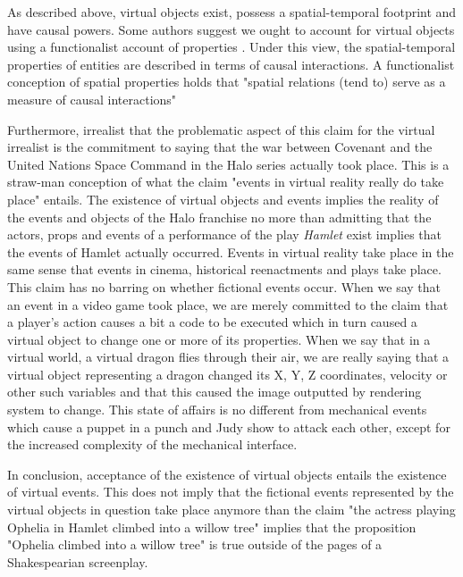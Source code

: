  As described above, virtual objects exist, possess a spatial-temporal footprint and have causal powers. Some authors suggest we ought to account for virtual objects using a functionalist account of properties \cite{ChalmersVR}. Under this view, the spatial-temporal properties of entities are described in terms of causal interactions. A functionalist conception of spatial properties holds that "spatial relations (tend to) serve as a measure of causal
interactions" \cite{ChalmersVR} 


   Furthermore, irrealist that the problematic aspect of this claim for the virtual irrealist is the commitment to saying that the war between Covenant and the United Nations Space Command in the Halo series actually took place. This is a straw-man conception of what the claim "events in virtual reality really do take place" entails. The existence of virtual objects and events implies the reality of the events and objects of the Halo franchise no more than admitting that the actors, props and events of a performance of the play \textit{Hamlet} exist implies that the events of Hamlet actually occurred. Events in virtual reality take place in the same sense that events in cinema, historical reenactments and plays take place. This claim has no barring on whether fictional events occur. When we say that an event in a video game took place, we are merely committed to the claim that a player's action causes a bit a code to be executed which in turn caused a virtual object to change one or more of its properties. When we say that in a  virtual world, a virtual dragon flies through their air, we are really saying that a virtual object representing a dragon changed its X, Y, Z coordinates, velocity or other such variables and that this caused the image outputted by rendering system to change. This state of affairs is no different from mechanical events which cause a puppet in a punch and Judy show to attack each other, except for the increased complexity of the mechanical interface. 

In conclusion, acceptance of the existence of virtual objects entails the existence of virtual events. This does not imply that the fictional events represented by the virtual objects in question take place anymore than the claim "the actress playing Ophelia in Hamlet climbed into a willow tree" implies that the proposition "Ophelia  climbed into a willow tree" is true outside of the pages of a Shakespearian screenplay.   
